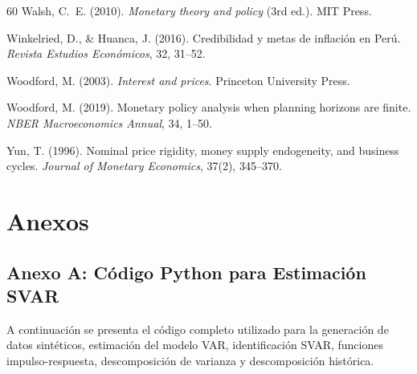 \documentclass[12pt,a4paper]{article}
\begin{document}
\begin{thebibliography}{60}
 Walsh, C.~E. (2010). \textit{Monetary theory and policy} (3rd ed.). MIT Press.

 Winkelried, D., \& Huanca, J. (2016). Credibilidad y metas de inflación en Perú. \textit{Revista Estudios Económicos}, 32, 31--52.

 Woodford, M. (2003). \textit{Interest and prices}. Princeton University Press.

 Woodford, M. (2019). Monetary policy analysis when planning horizons are finite. \textit{NBER Macroeconomics Annual}, 34, 1--50.

 Yun, T. (1996). Nominal price rigidity, money supply endogeneity, and business cycles. \textit{Journal of Monetary Economics}, 37(2), 345--370.

\end{thebibliography}

\newpage
\appendix
\section*{Anexos}

\subsection*{Anexo A: Código Python para Estimación SVAR}

\medskip
\noindent A continuación se presenta el código completo utilizado para la generación de datos sintéticos, estimación del modelo VAR, identificación SVAR, funciones impulso-respuesta, descomposición de varianza y descomposición histórica.
\end{document}
